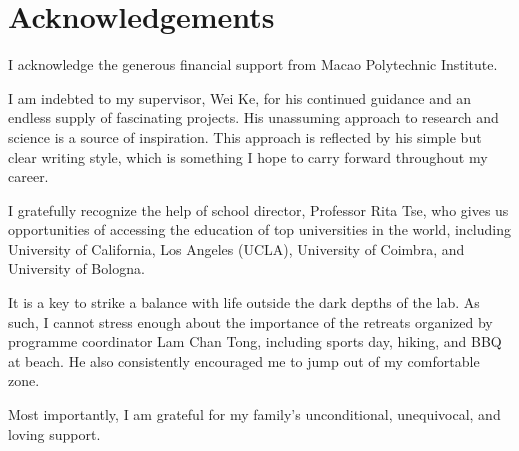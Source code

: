 \chapter{Acknowledgements}

I acknowledge the generous financial support from Macao Polytechnic Institute.

I am indebted to my supervisor, Wei Ke, for his continued guidance and an endless supply of fascinating projects. His unassuming approach to research and science is a source of inspiration. This approach is reflected by his simple but clear writing style, which is something I hope to carry forward throughout my career.

I gratefully recognize the help of school director, Professor Rita Tse, who gives us opportunities of accessing the education of top universities in the world, including University of California, Los Angeles (UCLA), University of Coimbra, and University of Bologna.


It is a key to strike a balance with life outside the dark depths of the lab. As such, I cannot stress enough about the importance of the retreats organized by programme coordinator Lam Chan Tong, including sports day, hiking, and BBQ at beach. He also consistently encouraged me to jump out of my comfortable zone.



Most importantly, I am grateful for my family's unconditional, unequivocal, and loving support.